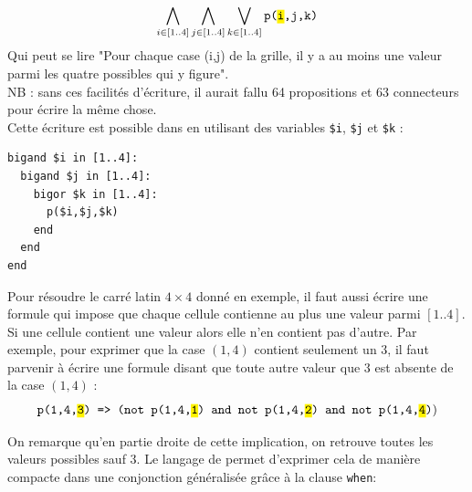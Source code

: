 \[\bigwedge_{i\in [1..4]}\bigwedge_{j\in [1..4]}\bigvee_{k\in [1..4]} \texttt{p(\hl{i},j,k)}\]
Qui peut se lire "Pour chaque case (i,j) de la grille, il y a au moins une valeur parmi les quatre possibles qui y figure". \\

\noindent NB : sans ces facilités d'écriture, il aurait fallu 64 propositions et 63 connecteurs pour écrire la même chose. \\

\noindent Cette écriture est possible dans \touist en utilisant des variables \texttt{\$i}, \texttt{\$j} et \texttt{\$k} :

\begin{lstlisting}
bigand $i in [1..4]:
  bigand $j in [1..4]:
    bigor $k in [1..4]:
      p($i,$j,$k)
    end
  end
end
\end{lstlisting}


Pour résoudre le carré latin $4\times 4$ donné en exemple, il faut aussi écrire une formule qui impose que chaque cellule contienne au plus une valeur parmi $[1..4]$. Si une cellule contient une valeur alors elle n'en contient pas d'autre. Par exemple, pour exprimer que la case $(1,4)$ contient seulement un 3, il faut parvenir à écrire une formule disant que toute autre valeur que 3 est absente de la case $(1,4)$ : 
\[\texttt{p(1,4,\hl{3}) => (not p(1,4,\hl{1}) and not p(1,4,\hl{2}) and not p(1,4,\hl{4})})\]


On remarque qu'en partie droite de cette implication, on retrouve toutes les valeurs possibles sauf 3. Le langage de \touist permet d'exprimer cela de manière compacte dans une conjonction généralisée grâce à la clause \texttt{when}: 

